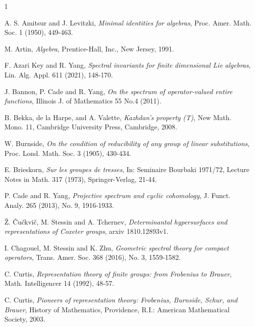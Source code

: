 \documentclass[draft, 12pt, reqno]{amsart}
\numberwithin{equation}{section}
\theoremstyle{plain}
\begin{document}
\vspace{.5cm}


\begin{thebibliography}{1}


 A. S. Amitsur and J. Levitzki, {\em Minimal identities for algebras}, Proc. Amer. Math. Soc. 1 (1950), 449-463.

 M. Artin, {\em Algebra}, Prentice-Hall, Inc., New Jersey, 1991.

 F. Azari Key and R. Yang, {\em Spectral invariants for finite dimensional Lie algebras}, Lin. Alg. Appl. 611 (2021), 148-170.

 J. Bannon, P. Cade and R. Yang, {\em On the spectrum of operator-valued entire functions}, Illinois J. of Mathematics 55 No.4 (2011).

 B. Bekka, de la Harpe, and A. Valette, {\em Kazhdan's property (T)}, New Math. Mono. 11, Cambridge University Press, Cambridge, 2008.

 W. Burnside, {\em On the condition of reducibility of any group of linear substitutions}, Proc. Lond. Math. Soc. 3 (1905), 430-434.

 E. Brieskorn, {\em Sur les groupes de tresses}, In: Seminaire Bourbaki 1971/72, Lecture Notes in Math. 317 (1973), Springer-Verlag, 21-44.


 P. Cade and R. Yang, {\em Projective spectrum and cyclic cohomology}, J. Funct. Analy. 265 (2013), No. 9, 1916-1933.

 \v{Z}. \v{C}u\v{c}kvi\v{c}, M. Stessin and A. Tchernev, {\em Determinantal hypersurfaces and representations of Coxeter groups}, arxiv 1810.12893v1.

 I. Chagouel, M. Stessin and K. Zhu, {\em Geometric spectral theory for compact operators}, Trans. Amer. Soc. 368 (2016), No. 3, 1559-1582.

 C. Curtis, {\em Representation theory of finite groups: from Frobenius to Brauer}, Math. Intelligencer 14 (1992), 48-57.

 C. Curtis, {\em Pioneers of representation theory: Frobenius, Burnside, Schur, and Brauer}, History of Mathematics, Providence, R.I.: American Mathematical Society, 2003.


\end{thebibliography}
\end{document}
